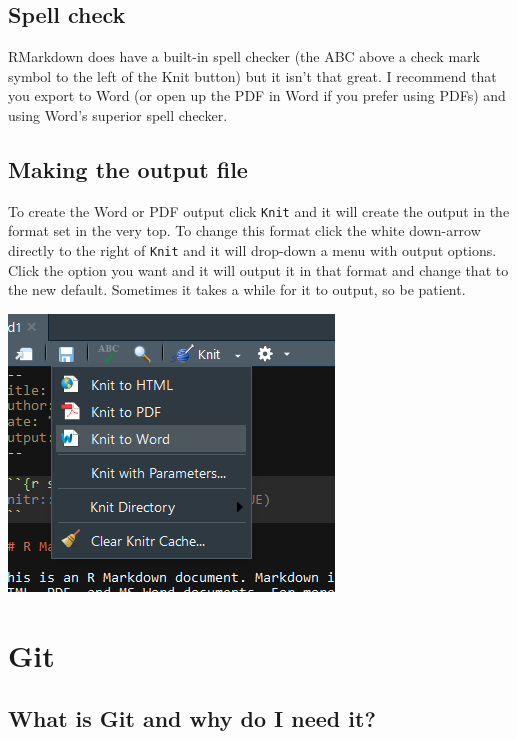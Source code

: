 \documentclass[
  12pt,
]{book}
\begin{document}
\hypertarget{spell-check}{%
\section{Spell check}\label{spell-check}}

RMarkdown does have a built-in spell checker (the ABC above a check mark symbol to the left of the Knit button) but it isn't that great. I recommend that you export to Word (or open up the PDF in Word if you prefer using PDFs) and using Word's superior spell checker.

\hypertarget{making-the-output-file}{%
\section{Making the output file}\label{making-the-output-file}}

To create the Word or PDF output click \texttt{Knit} and it will create the output in the format set in the very top. To change this format click the white down-arrow directly to the right of \texttt{Knit} and it will drop-down a menu with output options. Click the option you want and it will output it in that format and change that to the new default. Sometimes it takes a while for it to output, so be patient.

\includegraphics{images/markdown4.PNG}

\hypertarget{git}{%
\chapter{Git}\label{git}}

\hypertarget{what-is-git-and-why-do-i-need-it}{%
\section{What is Git and why do I need it?}\label{what-is-git-and-why-do-i-need-it}}
\end{document}
